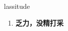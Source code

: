 
\begin{frame}
{\huge lassitude}
\begin{center}
\begin{enumerate}\Large
  \item \textbf{乏力，没精打采}
\end{enumerate}
\end{center}
\end{frame}
